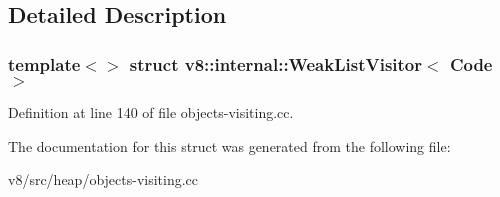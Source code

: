 \subsection{Detailed Description}
\subsubsection*{template$<$$>$\newline
struct v8\+::internal\+::\+Weak\+List\+Visitor$<$ Code $>$}



Definition at line 140 of file objects-\/visiting.\+cc.



The documentation for this struct was generated from the following file\+:\begin{DoxyCompactItemize}
\item 
v8/src/heap/objects-\/visiting.\+cc\end{DoxyCompactItemize}

